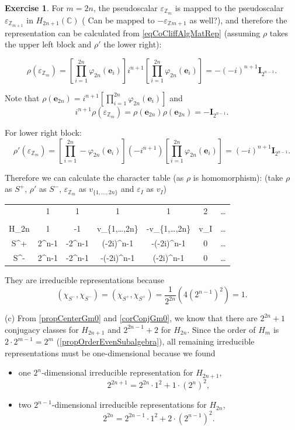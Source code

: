 \documentclass[12pt, letterpaper]{article}
\newcommand{\inte}{\mathbb{Z}}
\newcommand{\co}{\mathbb{C}}
\newcommand{\idm}{\mathbf{I}}
\newcommand{\bfe}{\mathbf{e}}
\newcommand{\red}[1]{{\color{red} #1}}
\theoremstyle{definition}
\theoremstyle{remark}
\theoremstyle{definition}
\newtheorem{exe}{Exercise}[section]
\theoremstyle{plain}
\numberwithin{equation}{section}
\begin{document}
\begin{exe}
		For $m=2n$, the pseudoscalar $\varepsilon_{\inte_m}$ is mapped to the pseudoscalar $\varepsilon_{\inte_{m+1}}$ in $H_{2n+1}(\co)$
		(\red{Can be mapped to $-\varepsilon_{\inte{m+1}}$ as well?}),
		and therefore the representation can be calculated from \eqref{eqCoCliffAlgMatRep}
		(assuming $\rho$ takes the upper left block and $\rho'$ the lower right):
		
		\[\rho(\varepsilon_{\inte_m}) = \left[\prod_{i=1}^{2n}\varphi_{2n}(\bfe_i)\right]i^{n+1}
		\left[\prod_{i=1}^{2n}\varphi_{2n}(\bfe_i)\right]=-(-i)^{n+1}\idm_{2^{n-1}}. \]
		
		Note that $\rho(\bfe_{2n})=i^{n+1}
		\left[\prod_{i=1}^{2n}\varphi_{2n}(\bfe_i)\right]$ and \[i^{n+1}\rho(\varepsilon_{\inte_m})=\rho(\bfe_{2n})\rho(\bfe_{2n})=-\idm_{2^{n-1}}.\]
		
		For lower right block:
		\[\rho'(\varepsilon_{\inte_m}) = \left[\prod_{i=1}^{2n}-\varphi_{2n}(\bfe_i)\right](-i^{n+1})
		\left[\prod_{i=1}^{2n}\varphi_{2n}(\bfe_i)\right]=(-i)^{n+1}\idm_{2^{n-1}}. \]
	
		Therefore we can calculate the character table (as $\rho$ is homomorphism): (take $\rho$ as $S^+$, $\rho'$ as $S^-$,
		$\varepsilon_{\inte_m}$ as $v_{\{1,\dots,2n\}}$ and $\varepsilon_I$ as $v_I$)
		\begin{center}
			\begin{tabular}{C | C C C C C C}
				& 1 & 1 & 1 & 1 & 2 & \dots \\
				\\
				H_{2n}& 1 & -1 & v_{\{1,\dots,2n\}} & -v_{\{1,\dots,2n\}} & \pm v_I & \dots\\
				\hline
				S^+ & 2^{n-1} & -2^{n-1} & (-2i)^{n-1} & -(-2i)^{n-1} & 0&\dots\\ 
				S^- & 2^{n-1} & -2^{n-1} & -(-2i)^{n-1} & (-2i)^{n-1} & 0&\dots\\ 				
			\end{tabular}
		\end{center}
	
		They are irreducible representations because 
		\[(\chi_{S^-},\chi_{S^-})=(\chi_{S^+},\chi_{S^+})=\frac{1}{2^{2n}}(4(2^{n-1})^2)=1.\]
	
		(c)	From \autoref{propCenterGm0} and \autoref{corConjGm0}, we know that there are
		$2^{2n}+1$ conjugacy classes for $H_{2n+1}$ and $2^{2n-1}+2$ for $H_{2n}$.
		Since the order of $H_m$ is $2\cdot2^{m-1}=2^m$ (\autoref{propOrderEvenSubalgebra}),
		all remaining irreducible representations must be one-dimensional %
		because we found
		\begin{itemize}
			\item one $2^n$-dimensional irreducible representation for $H_{2n+1}$,
			\[2^{2n+1}=2^{2n}\cdot 1^2+1\cdot (2^n)^2,\]
			\item two $2^{n-1}$-dimensional irreducible representations for $H_{2n}$,
			\[2^{2n}=2^{2n-1}\cdot 1^2+2\cdot (2^{n-1})^2.\]
		\end{itemize}
		

\end{exe}
\end{document}
